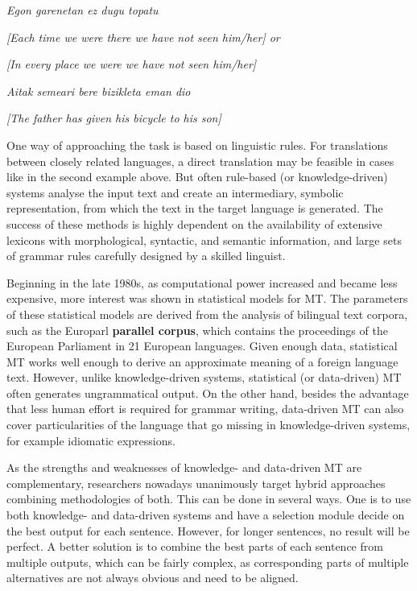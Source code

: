 \begin{multicols}{2}
\textit{Egon garenetan ez dugu topatu}

\textit{[Each time we were there we have not seen him/her] or }

\textit{[In every place we were we have not seen him/her]}

\textit{Aitak semeari bere bizikleta eman dio}

\textit{[The father has given his bicycle to his son]}

One way of approaching the task is based on linguistic rules. For translations between closely related languages, a direct translation may be feasible in cases like in the second example above. But often rule-based (or knowledge-driven) systems analyse the input text and create an intermediary, symbolic representation, from which the text in the target language is generated. The success of these methods is highly dependent on the availability of extensive lexicons with morphological, syntactic, and semantic information, and large sets of grammar rules carefully designed by a skilled linguist.

Beginning in the late 1980s, as computational power increased and became less expensive, more interest was shown in statistical models for MT. The parameters of these statistical models are derived from the analysis of bilingual text 
corpora, such as the Europarl 
\textbf{parallel corpus}, which contains the proceedings of the European Parliament in 21 European languages. Given enough data, statistical MT works well enough to derive an approximate meaning of a foreign language text. However, unlike knowledge-driven systems, statistical (or data-driven) MT often generates ungrammatical output. On the other hand, besides the advantage that less human effort is required for grammar writing, data-driven MT can also cover particularities of the language that go missing in knowledge-driven systems, for example idiomatic expressions. 

As the strengths and weaknesses of knowledge- and data-driven MT are complementary, researchers nowadays unanimously target hybrid approaches combining methodologies of both. This can be done in several ways. One is to use both knowledge- and data-driven systems and have a selection module decide on the best output for each sentence. However, for longer sentences, no result will be perfect. A better solution is to combine the best parts of each sentence from multiple outputs, which can be fairly complex, as corresponding parts of multiple alternatives are not always obvious and need to be aligned. 


\end{multicols}
